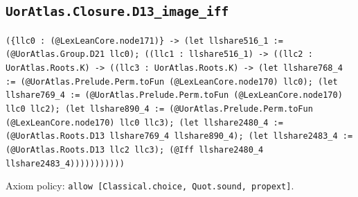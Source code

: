 \documentclass[11pt]{article}
\begin{document}
\subsection*{\texttt{UorAtlas.Closure.D13\_image\_iff}}
\noindent\texttt{(\{llc0 : (@LexLeanCore.node171)\} -> (let llshare516\_1 := (@UorAtlas.Group.D21 llc0); ((llc1 : llshare516\_1) -> ((llc2 : UorAtlas.Roots.K) -> ((llc3 : UorAtlas.Roots.K) -> (let llshare768\_4 := (@UorAtlas.Prelude.Perm.toFun (@LexLeanCore.node170) llc0); (let llshare769\_4 := (@UorAtlas.Prelude.Perm.toFun (@LexLeanCore.node170) llc0 llc2); (let llshare890\_4 := (@UorAtlas.Prelude.Perm.toFun (@LexLeanCore.node170) llc0 llc3); (let llshare2480\_4 := (@UorAtlas.Roots.D13 llshare769\_4 llshare890\_4); (let llshare2483\_4 := (@UorAtlas.Roots.D13 llc2 llc3); (@Iff llshare2480\_4 llshare2483\_4)))))))))))}\par
\noindent Axiom policy: \texttt{allow [Classical.choice, Quot.sound, propext]}.\par
\end{document}

